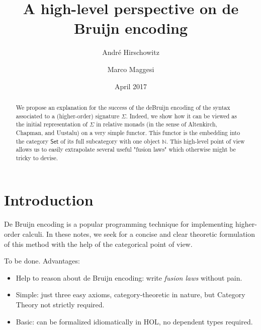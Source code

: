 \documentclass[a4paper,twoside,12pt]{article}
\title{A high-level perspective on de Bruijn encoding}
\author{Andr\'e Hirschowitz \and Marco Maggesi}
\date{April 2017}
\theoremstyle{definition}
\theoremstyle{remark}
\theoremstyle{example}
\newcommand{\NN}{\mathbb{N}}
\begin{document}
\maketitle

\begin{abstract}

  We propose an explanation for the success of the deBruijn encoding
  of the syntax associated to a (higher-order) signature $\Sigma$.
  Indeed, we show how it can be viewed as the initial representation
  of $\Sigma$ in relative monads (in the sense of Altenkirch, Chapman,
  and Uustalu) on a very simple functor.  This functor is the
  embedding into the category $\mathsf{Set}$ of its full subcategory
  with one object $\NN$.  This high-level point of view allows us to
  easily extrapolate several useful "fusion laws" which otherwise
  might be tricky to devise.
\end{abstract}

\tableofcontents{}

\section{Introduction}
\label{sec:intro}

De Bruijn encoding is a popular programming technique for implementing
higher-order calculi.  In these notes, we seek for a concise and clear
theoretic formulation of this method with the help of the categorical
point of view.

To be done.
Advantages:
\begin{itemize}
\item Help to reason about de Bruijn encoding: write \emph{fusion
    laws} without pain.
\item Simple: just three easy axioms, category-theoretic in nature,
  but Category Theory not strictly required.
\item Basic: can be formalized idiomatically in HOL, no dependent
  types required.
\end{itemize}
\end{document}
